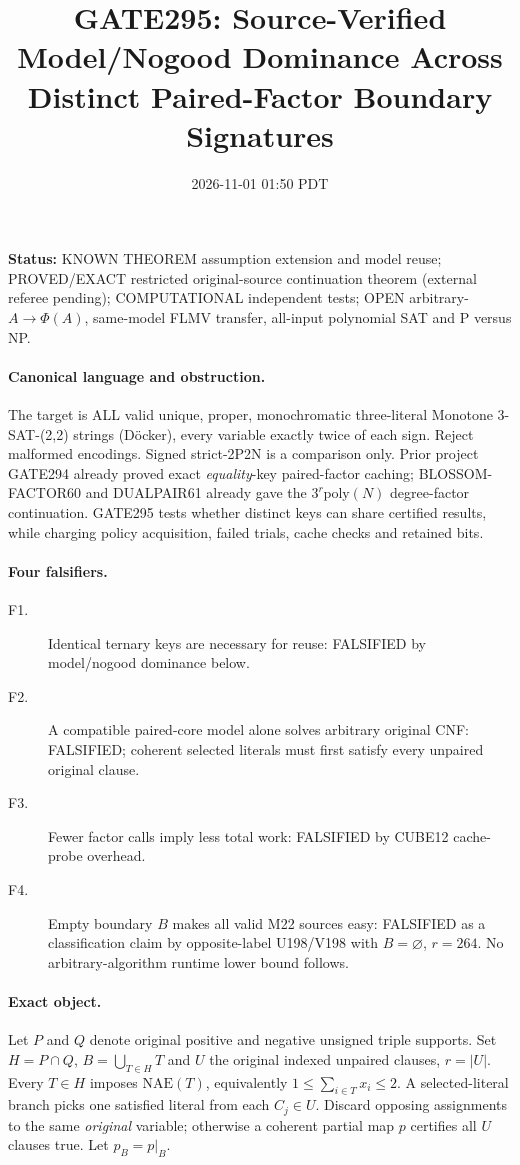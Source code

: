 \documentclass[10pt]{article}
\title{GATE295: Source-Verified Model/Nogood Dominance Across Distinct Paired-Factor Boundary Signatures}
\date{2026-11-01 01:50 PDT}
\begin{document}
\maketitle
\noindent\textbf{Status:} \textsf{KNOWN THEOREM} assumption extension and model reuse; \textsf{PROVED/EXACT restricted} original-source continuation theorem (external referee pending); \textsf{COMPUTATIONAL} independent tests; \textsf{OPEN} arbitrary-$A\to\Phi(A)$, same-model FLMV transfer, all-input polynomial SAT and P versus NP.

\paragraph{Canonical language and obstruction.}
The target is ALL valid unique, proper, monochromatic three-literal Monotone 3-SAT-(2,2) strings (D\"ocker), every variable exactly twice of each sign. Reject malformed encodings. Signed strict-2P2N is a comparison only. Prior project GATE294 already proved exact \emph{equality}-key paired-factor caching; BLOSSOM-FACTOR60 and DUALPAIR61 already gave the $3^r\mathrm{poly}(N)$ degree-factor continuation. GATE295 tests whether distinct keys can share certified results, while charging policy acquisition, failed trials, cache checks and retained bits.

\paragraph{Four falsifiers.}
\begin{description}
\item[F1.] Identical ternary keys are necessary for reuse: \textsf{FALSIFIED} by model/nogood dominance below.
\item[F2.] A compatible paired-core model alone solves arbitrary original CNF: \textsf{FALSIFIED}; coherent selected literals must first satisfy every unpaired original clause.
\item[F3.] Fewer factor calls imply less total work: \textsf{FALSIFIED} by CUBE12 cache-probe overhead.
\item[F4.] Empty boundary $B$ makes all valid M22 sources easy: \textsf{FALSIFIED} as a classification claim by opposite-label U198/V198 with $B=\varnothing$, $r=264$. No arbitrary-algorithm runtime lower bound follows.
\end{description}

\paragraph{Exact object.}
Let $P$ and $Q$ denote original positive and negative unsigned triple supports. Set $H=P\cap Q$, $B=\bigcup_{T\in H}T$ and $U$ the original indexed unpaired clauses, $r=|U|$. Every $T\in H$ imposes $\mathrm{NAE}(T)$, equivalently $1\le\sum_{i\in T}x_i\le2$. A selected-literal branch picks one satisfied literal from each $C_j\in U$. Discard opposing assignments to the same \emph{original} variable; otherwise a coherent partial map $p$ certifies all $U$ clauses true. Let $p_B=p|_B$.
\end{document}
